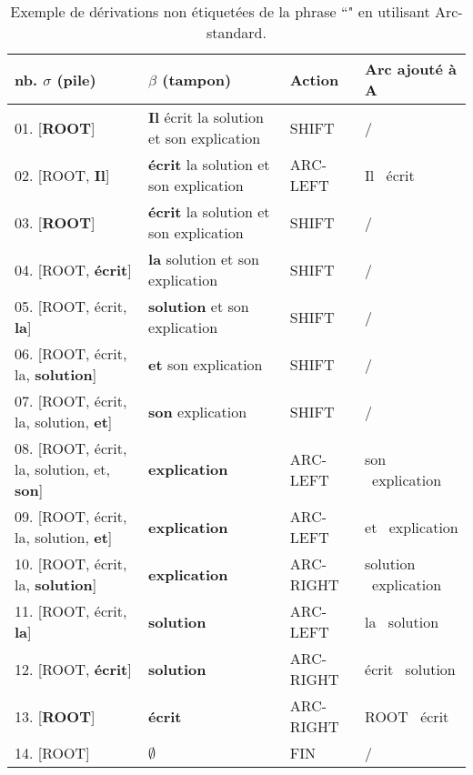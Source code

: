 \documentclass{KodeBook}
\begin{document}
\begin{table}[ht]
	\centering\footnotesize
	\begin{tabular}{llll}
		\hline\hline
		nb. $\sigma$ (pile) & $\beta$ (tampon) & Action & Arc ajouté à A \\
		\hline
		01. [\textbf{ROOT}] & \textbf{Il} écrit la solution et son explication & SHIFT & / \\
		02. [ROOT, \textbf{Il}] & \textbf{écrit} la solution et son explication & ARC-LEFT & Il \textleftarrow\ écrit\\
		03. [\textbf{ROOT}] & \textbf{écrit} la solution et son explication & SHIFT & / \\
		04. [ROOT, \textbf{écrit}] & \textbf{la} solution et son explication & SHIFT & / \\
		05. [ROOT, écrit, \textbf{la}] & \textbf{solution} et son explication & SHIFT & / \\
		06. [ROOT, écrit, la, \textbf{solution}] & \textbf{et} son explication & SHIFT & / \\
		07. [ROOT, écrit, la, solution, \textbf{et}] & \textbf{son} explication & SHIFT & / \\
		08. [ROOT, écrit, la, solution, et, \textbf{son}] & \textbf{explication} & ARC-LEFT & son \textleftarrow\ explication\\
		09. [ROOT, écrit, la, solution, \textbf{et}] & \textbf{explication} & ARC-LEFT & et \textleftarrow\ explication\\
		10. [ROOT, écrit, la, \textbf{solution}] & \textbf{explication} & ARC-RIGHT & solution \textrightarrow\ explication\\
		11. [ROOT, écrit, \textbf{la}] & \textbf{solution} & ARC-LEFT & la \textleftarrow\ solution\\
		12. [ROOT, \textbf{écrit}] & \textbf{solution} & ARC-RIGHT & écrit \textrightarrow\ solution\\
		13. [\textbf{ROOT}] & \textbf{écrit} & ARC-RIGHT & ROOT \textrightarrow\ écrit\\
		14. [ROOT] & $\emptyset$ & FIN & / \\
		\hline\hline
	\end{tabular}
	\caption[Exemple de dérivations non étiquetées en utilisant Arc-standard.]{Exemple de dérivations non étiquetées de la phrase ``" en utilisant Arc-standard.}
	\label{tab:arc-standard-exp}
\end{table}
\end{document}
